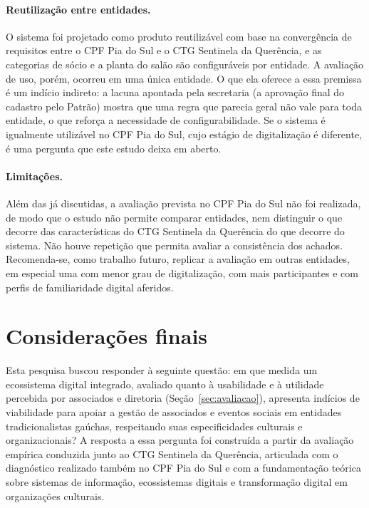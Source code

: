 \documentclass[12pt,a4paper]{article}
\begin{document}
\paragraph{Reutilização entre entidades.} O sistema foi projetado como produto reutilizável com base
na convergência de requisitos entre o CPF Pia do Sul e o CTG Sentinela da Querência, e as categorias de
sócio e a planta do salão são configuráveis por entidade. A avaliação de uso, porém, ocorreu em uma
única entidade. O que ela oferece a essa premissa é um indício indireto: a lacuna apontada pela
secretaria (a aprovação final do cadastro pelo Patrão) mostra que uma regra que parecia geral não vale
para toda entidade, o que reforça a necessidade de configurabilidade. Se o sistema é igualmente
utilizável no CPF Pia do Sul, cujo estágio de digitalização é diferente, é uma pergunta que este
estudo deixa em aberto.

\paragraph{Limitações.} Além das já discutidas, a avaliação prevista no CPF Pia do Sul não foi
realizada, de modo que o estudo não permite comparar entidades, nem
distinguir o que decorre das características do CTG Sentinela da Querência do que decorre do sistema.
Não houve repetição que permita avaliar a consistência dos achados. Recomenda-se, como trabalho
futuro, replicar a avaliação em outras entidades, em especial uma com menor grau de digitalização,
com mais participantes e com perfis de familiaridade digital aferidos.

\section{Considerações finais}

Esta pesquisa buscou responder à seguinte questão: em que medida um ecossistema digital integrado,
avaliado quanto à usabilidade e à utilidade percebida por associados e diretoria
(Seção~\ref{sec:avaliacao}), apresenta indícios de viabilidade para apoiar a gestão de associados e
eventos sociais em entidades tradicionalistas gaúchas, respeitando suas especificidades culturais e
organizacionais? A resposta a essa pergunta foi construída a partir da avaliação empírica conduzida
junto ao CTG Sentinela da Querência, articulada com o diagnóstico realizado também no CPF Pia do Sul e com a
fundamentação teórica sobre sistemas de informação, ecossistemas digitais e transformação digital em
organizações culturais.
\end{document}
